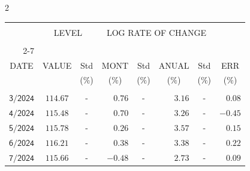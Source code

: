 \begin{multicols}{2}{ 
\begin{tabular}{rccrcrcr} 
\hline 
 \multicolumn{1}{|c|}{}  &  \multicolumn{2}{c|}{} & 
\multicolumn{4}{c}{} & \multicolumn{1}{|c|}{}\vspace{-.10in}\\ 
\multicolumn{1}{|c|}{}  &  \multicolumn{2}{c|}{LEVEL} & 
\multicolumn{4}{c}{LOG RATE OF CHANGE} & \multicolumn{1}{|c|}{}    \\  
\multicolumn{1}{|c|}{}  &  \multicolumn{2}{c|}{} & 
\multicolumn{4}{c}{} & \multicolumn{1}{|c|}{}\vspace{-.10in}\\ \cline{2-7} 
\multicolumn{1}{|c|}{ } &\multicolumn{1}{c|}{ } & \multicolumn{1}{c|}{} & \multicolumn{1}{c|}{} & \multicolumn{1}{c|}{}     & \multicolumn{1}{c|}{} & \multicolumn{1}{c|}{}  & \multicolumn{1}{c|}{}  \vspace{-.05in}\\  
\multicolumn{1}{|c|}{DATE } &\multicolumn{1}{c|}{ VALUE} & \multicolumn{1}{c|}{Std} & \multicolumn{1}{c|}{MONT} & \multicolumn{1}{c|}{Std}     & \multicolumn{1}{c|}{ANUAL} & \multicolumn{1}{c|}{Std}  & \multicolumn{1}{c|}{ERR}\\  
\multicolumn{1}{|c|}{ }      & \multicolumn{1}{c|}{  }    & \multicolumn{1}{c|}{($\%$)}&  \multicolumn{1}{c|}{($\%$)  }  & \multicolumn{1}{c|}{($\%$)} & \multicolumn{1}{c|}{($\%$) }     & \multicolumn{1}{c|}{ ($\%$) }  &  \multicolumn{1}{c|}{ ($\%$) } \\  
 \hline 
 \\$\mathsf{       3/2024}$ &$\mathsf{   114.67}$ &     - &$\mathsf{    0.76}$ &     - &$\mathsf{     3.16 }$ &     - &$\mathsf{   0.08} $ \vspace{-.005in}\\ 
$\mathsf{       4/2024}$ &$\mathsf{   115.48}$ &     - &$\mathsf{    0.70}$ &     - &$\mathsf{     3.26 }$ &     - &$\mathsf{  -0.45} $ \vspace{-.005in}\\ 
$\mathsf{       5/2024}$ &$\mathsf{   115.78}$ &     - &$\mathsf{    0.26}$ &     - &$\mathsf{     3.57 }$ &     - &$\mathsf{   0.15} $ \vspace{-.005in}\\ 
$\mathsf{       6/2024}$ &$\mathsf{   116.21}$ &     - &$\mathsf{    0.38}$ &     - &$\mathsf{     3.38 }$ &     - &$\mathsf{   0.22} $ \vspace{-.005in}\\ 
$\mathsf{       7/2024}$ &$\mathsf{   115.66}$ &     - &$\mathsf{   -0.48}$ &     - &$\mathsf{     2.73 }$ &     - &$\mathsf{   0.09} $ \vspace{-.005in}\\ 

\end{tabular}}
\end{multicols}

